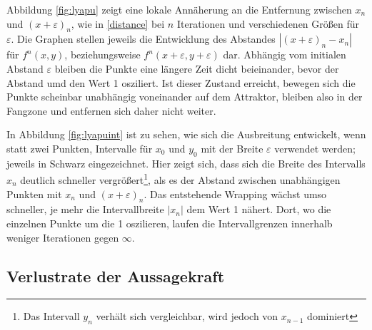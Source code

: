  
 Abbildung \ref{fig:lyapu} zeigt eine lokale Annäherung an die Entfernung zwischen $x_n$ und $(x+\varepsilon)_n$, wie in \ref{distance} bei $n$ Iterationen und verschiedenen Größen für $\varepsilon$. Die Graphen stellen jeweils die Entwicklung des Abstandes $|(x+\varepsilon)_n - x_n|$ für $f^n(x,y)$, beziehungsweise $f^n(x+\varepsilon,y+\varepsilon)$ dar. Abhängig vom initialen Abstand $\varepsilon$ bleiben die Punkte eine längere Zeit dicht beieinander, bevor der Abstand umd den Wert 1 osziliert. Ist dieser Zustand erreicht, bewegen sich die Punkte scheinbar unabhängig voneinander auf dem Attraktor, bleiben also in der Fangzone und entfernen sich daher nicht weiter. 

 
 
 In Abbildung \ref{fig:lyapuint} ist zu sehen, wie sich die Ausbreitung entwickelt, wenn statt zwei Punkten, Intervalle für $x_0$ und $y_0$ mit der Breite $\varepsilon$ verwendet werden; jeweils in Schwarz eingezeichnet. Hier zeigt sich, dass sich die Breite des Intervalls $x_n$ deutlich schneller vergrößert\footnote{Das Intervall $y_n$ verhält sich vergleichbar, wird jedoch von $x_{n-1}$ dominiert}, als es der Abstand zwischen unabhängigen Punkten mit $x_n$ und $(x+\varepsilon)_n$. Das entstehende Wrapping wächst umso schneller, je mehr die Intervallbreite $|x_n|$ dem Wert 1 nähert. Dort, wo die einzelnen Punkte um die 1 oszilieren, laufen die Intervallgrenzen innerhalb weniger Iterationen gegen $\infty$.
 
 \subsection{Verlustrate der Aussagekraft}  
 
